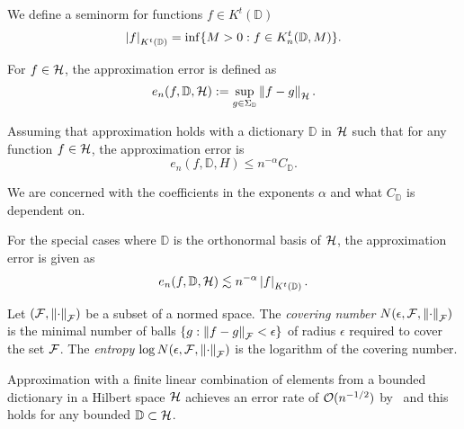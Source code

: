 We define a seminorm for functions $f \in K^t(\mathbb{D})$
\begin{equation}
    \label{eq:general_seminorm}
    \left| f \right|_{K^t(\mathbb{D})} = \inf \{
        M >0: f \in K^t_n(\mathbb{D}, M)
    \}.
\end{equation}

For $f \in \mathcal{H}$, the approximation error is defined as
\begin{equation}
    \label{eq:appro_err_hilbert}
    e_n(f, \mathbb{D}, \mathcal{H})
        := \sup_{g\in\Sigma_{\mathbb{D}}} \left\| f - g \right\|_{\mathcal{H}}.
\end{equation}

Assuming that approximation holds with a dictionary $\mathbb{D}$ in $\mathcal{H}$
such that for any function $f \in \mathcal{H}$, the approximation error is
\begin{equation}
    \label{eq:appro_error_general}
    e_n(f, \mathbb{D}, H) \leq n^{-\alpha} C_{\mathbb{D}}.
\end{equation}

We are concerned with the coefficients in the exponents $\alpha$ and what
$C_{\mathbb{D}}$ is dependent on.

For the special cases where $\mathbb{D}$ is the orthonormal basis of $\mathcal{H}$,
the approximation error is given as
\begin{equation}
    \label{eq:appro_error_ortho}
    e_n(f, \mathbb{D}, \mathcal{H}) 
        \lesssim n^{-\alpha} \left| f \right|_{K^t(\mathbb{D})}.
\end{equation}

\begin{definition}
    \label{def:covering_num}
    Let $(\mathcal{F}, \left\| \cdot \right\|_{\mathcal{F}})$ be a subset of a normed space. The
    \textit{covering number} $N(\epsilon, \mathcal{F}, \left\| \cdot \right\|_{\mathcal{F}})$ is
    the minimal number of balls $\{g: \left\| f - g \right\|_{\mathcal{F}} < \epsilon\}$ of
    radius $\epsilon$ required to cover the set $\mathcal{F}$. The \textit{entropy}
    $\log N(\epsilon, \mathcal{F}, \left\| \cdot \right\|_{\mathcal{F}})$ is the logarithm of
    the covering number.
\end{definition}

Approximation with a finite linear combination of elements from a bounded
dictionary in a Hilbert space $\mathcal{H}$ achieves an error rate of
$\mathcal{O}(n^{-1/2})$ by~\cite{pisierRemarquesResultatNon1980} and this holds for
any bounded $\mathbb{D} \subset \mathcal{H}$.

